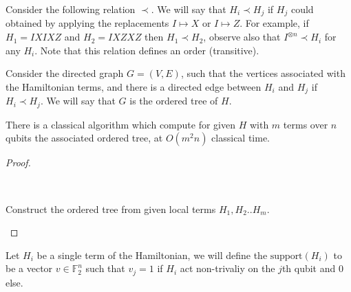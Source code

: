 \documentclass{article}
\begin{document}
\begin{definition}
  Consider the following relation $\prec$. We will say that $H_{i} \prec H_{j}$ if $H_{j}$ could obtained by applying the replacements $I \mapsto X  $ or $ I \mapsto Z$. For example, if $H_{1} = IXIXZ$ and $H_{2}=IXZXZ$ then $H_{1}\prec H_{2}$, observe also that $I^{\otimes n} \prec H_{i}$ for any $H_{i}$. Note that this relation defines an order (transitive). 
\end{definition}
\begin{definition} 
  Consider the directed graph $G=\left( V,E \right)$, such that the vertices associated with the Hamiltonian terms, and there is a directed edge between $H_{i}$ and $H_{j}$ if $H_{i} \prec H_{j}$. We will say that $G$ is the ordered tree of $H$. 
\end{definition}

\begin{lemma}
  There is a classical algorithm which compute for given $H$ with $m$ terms over $n$ qubits the associated ordered tree, at $O\left( m^{2}n \right)$ classical time.  
\end{lemma}
\begin{proof}


\begin{algorithm}[H]
	\SetAlgoLined
	\ \\ 
	\caption{Construct the ordered tree from given local terms $H_{1}, H_{2} .. H_{m}$.}
      \end{algorithm}
    \end{proof}
\begin{definition}
  Let \(H_{i}\) be a single term of the Hamiltonian, we will define the \( \text{support}(H_{i}) \) to be a vector \( v \in \mathbb{F}^{n}_2\) such that \(v_j = 1\) if \(H_{i}\) act non-trivaliy on the \(j\)th qubit and \(0\) else.
\end{definition}
\end{document}
